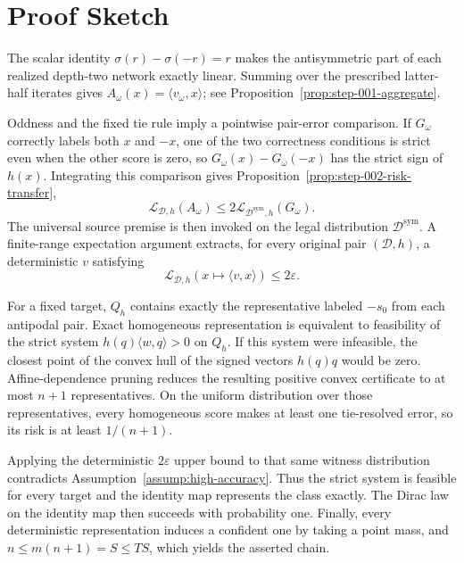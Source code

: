 \section{Proof Sketch}
\label{sec:proof-sketch}

The scalar identity $\sigma(r)-\sigma(-r)=r$ makes the antisymmetric part of
each realized depth-two network exactly linear.  Summing over the prescribed
latter-half iterates gives
$A_\omega(x)=\langle v_\omega,x\rangle$; see
Proposition~\ref{prop:step-001-aggregate}.

Oddness and the fixed tie rule imply a pointwise pair-error comparison.  If
$G_\omega$ correctly labels both $x$ and $-x$, one of the two correctness
conditions is strict even when the other score is zero, so
$G_\omega(x)-G_\omega(-x)$ has the strict sign of $h(x)$.  Integrating this
comparison gives Proposition~\ref{prop:step-002-risk-transfer},
\[
\mathcal L_{\mathcal D,h}(A_\omega)
\leq2\mathcal L_{\mathcal D^{\mathrm{sym}},h}(G_\omega).
\]
The universal source premise is then invoked on the legal distribution
$\mathcal D^{\mathrm{sym}}$.  A finite-range expectation argument extracts,
for every original pair $(\mathcal D,h)$, a deterministic $v$ satisfying
\[
\mathcal L_{\mathcal D,h}(x\mapsto\langle v,x\rangle)
\leq2\varepsilon.
\]

For a fixed target, $Q_h$ contains exactly the representative labeled
$-s_0$ from each antipodal pair.  Exact homogeneous representation is
equivalent to feasibility of the strict system
$h(q)\langle w,q\rangle>0$ on $Q_h$.  If this system were infeasible, the
closest point of the convex hull of the signed vectors $h(q)q$ would be zero.
Affine-dependence pruning reduces the resulting positive convex certificate
to at most $n+1$ representatives.  On the uniform distribution over those
representatives, every homogeneous score makes at least one tie-resolved
error, so its risk is at least $1/(n+1)$.

Applying the deterministic $2\varepsilon$ upper bound to that same witness
distribution contradicts Assumption~\ref{assump:high-accuracy}.  Thus the
strict system is feasible for every target and the identity map represents
the class exactly.  The Dirac law on the identity map then succeeds with
probability one.  Finally, every deterministic representation induces a
confident one by taking a point mass, and
$n\leq m(n+1)=S\leq TS$, which yields the asserted chain.
